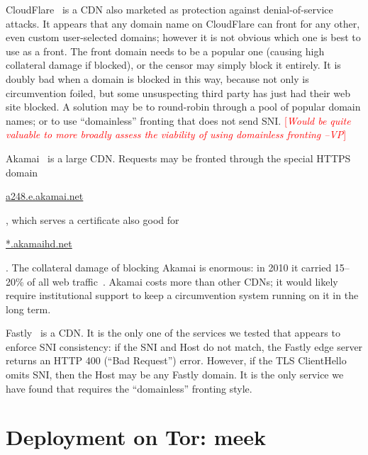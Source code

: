 \documentclass{sig-alternate}
\newcommand{\meek}{meek\xspace}
\def\urll#1{\begin{NoHyper}\url{#1}\end{NoHyper}}
\newcommand{\note}[1]{{\textcolor{red}{[\textit{#1}]}}}
\newcommand{\vp}[1]{\note{#1 --VP}}
\begin{document}
CloudFlare~\cite{cloudflare}
is a CDN also marketed as protection against
denial-of-service attacks.
It appears that any domain name on CloudFlare
can front for any other, even custom user-selected domains;
however it is not obvious which one is best to use as a front.
The front domain needs to be a popular one
(causing high collateral damage if blocked),
or the censor may simply block it entirely.
It is doubly bad when a domain is blocked in this way,
because not only is circumvention foiled,
but some unsuspecting third party has just had their web site blocked.
A solution may be to round-robin through
a pool of popular domain names;
or to use ``domainless'' fronting that does not send SNI.
\vp{Would be quite valuable to more broadly assess the viability
of using domainless fronting}

Akamai~\cite{akamai-site} is a large CDN.
Requests may be fronted through the special HTTPS domain
\urll{a248.e.akamai.net},
which serves a certificate also good for \urll{*.akamaihd.net}.
The collateral damage of blocking Akamai is enormous:
in 2010 it carried 15--20\% of all web traffic~\cite{akamai}.
Akamai costs more than other CDNs;
it would likely require institutional support
to keep a circumvention system running on it in the long term.

Fastly~\cite{fastly} is a CDN.
It is the only one of the services we tested that
appears to enforce SNI consistency:
if the SNI and Host do not match,
the Fastly edge server returns an HTTP 400 (``Bad Request'') error.
However, if the TLS ClientHello omits SNI, then the Host may be any Fastly domain.
It is the only service we have found
that requires the ``domainless'' fronting style.


\section{Deployment on Tor: meek}
\label{sec:deploy-tor}
\end{document}
